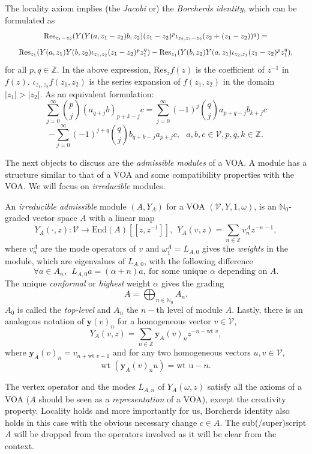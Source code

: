 \documentclass[twoside,11pt,titlepage]{amsart}
\renewcommand{\=}[1]{\stackrel{#1}{=}} %
\theoremstyle{definition}
\theoremstyle{remark}
\begin{document}
The locality axiom implies (the \textit{Jacobi} or) the \textit{Borcherds identity}, 
which can be formulated as 
\begin{gather*}
\scalebox{0.9}{$\text{Res}_{z_1-z_2}(Y(Y(a,z_1-z_2)b,z_2)(z_1-z_2)^p \iota_{z_2,z_1-z_2}(z_2+(z_1-z_2))^q)=$}
\end{gather*}
\begin{gather*}
\scalebox{0.9}{$\text{Res}_{z_1}(Y(a,z_1)Y(b,z_2)\iota_{z_1,z_2}(z_1-z_2)^pz_1^q)-\text{Res}_{z_1}(Y(b,z_2)Y(a,z_1)\iota_{z_2,z_1}(z_1-z_2)^pz_1^q),$}
\end{gather*}
for all $p,q\in \mathbb{Z}$. In the above expression, $\text{Res}_zf(z)$ is the coefficient of $z^{-1}$ in $f(z)$. $\iota_{z_1,z_2}f(z_1,z_2)$ is the series expansion of $f(z_1,z_2)$ in the domain $|z_1|>|z_2|$. As an equivalent formulation:
$$\sum_{j=0}^\infty \binom{p}{j} (a_{q+j}b)_{p+k-j}c=\sum_{j=0}^{\infty}(-1)^j\binom{q}{j}a_{p+q-j}b_{k+j}c$$
$$-\sum_{j=0}^{\infty}(-1)^{j+q} \binom{q}{j}b_{q+k-j}a_{p+j}c, \ \ \ a,b,c \in \mathcal{V}, p,q,k \in \mathbb{Z}.$$
 
The next objects to discuss are the \textit{admissible modules} of a VOA. A module has a structure similar to that of a VOA and some compatibility properties with the VOA. We will focus on \textit{irreducible} modules.

An \textit{irreducible admissible} module $(A,Y_A)$ for a VOA $(\mathcal{V},Y,1,\omega)$, is an $\mathbb{N}_0$-graded vector space $A$ with a linear map
$$Y_A(\cdot,z): \mathcal{V} \to \text{End}(A)[[z,z^{-1}]], \ \ Y_A(v,z)=\sum_{n \in \mathbb{Z}}v_n^Az^{-n-1},$$
where $v_n^A$ are the mode operators of $v$ and $\omega_{1}^A=L_{A,0}$ gives the \textit{weights} in the module, which are eigenvalues of $L_{A,0}$, with the following difference 
$$\forall a \in A_n, \ \ L_{A,0}a=(\alpha+n)a, \  \text{for some unique }\alpha \text{ depending on } A.$$
The unique \textit{conformal} or \textit{highest} weight $\alpha$ gives the grading 
$$A=\bigoplus_{n \in \mathbb{N}_0} A_{n}.$$
$A_0$ is called the \textit{top-level} and $A_n$ the $n-$th level of module $A$.  Lastly, there is an analogous notation of $\textbf{y}(v)_n$ for a homogeneous vector $v \in \mathcal{V}$,
$$Y_A(v,z)=\sum_{n\in \mathbb{Z}} \textbf{y}_A(v)_nz^{-n-\text{wt }v},$$ 
where $\textbf{y}_A(v)_n=v_{n+ \text{wt }v-1}$ and for any two homogeneous vectors $u,v \in \mathcal{V}$,  
$$\text{wt }(\textbf{y}_A(v)_nu)=\text{wt u}-n.$$

The vertex operator and the modes $L_{A,n}$ of $Y_A(\omega,z)$ satisfy all the axioms of a VOA ($A$ should be seen as a \textit{representation} of a VOA), except the creativity property. Locality holds and more importantly for us, Borcherds identity also holds in this case with the obvious necessary change $c \in A$. The sub(/super)script $A$ will be dropped from the operators involved as it will be clear from the context.
\end{document}
